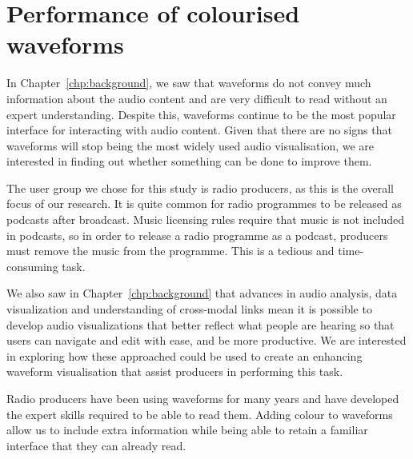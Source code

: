 \chapter{Performance of colourised waveforms}\label{chp:colourised}

In Chapter~\ref{chp:background}, we saw that waveforms do not convey much information about the audio content and are
very difficult to read without an expert understanding.
Despite this, waveforms continue to be the most popular interface for interacting with audio content.
Given that there are no signs that waveforms will stop being the most widely used audio visualisation, we are
interested in finding out whether something can be done to improve them.

The user group we chose for this study is radio producers, as this is the overall focus of our research.
It is quite common for radio programmes to be released as podcasts after broadcast.
Music licensing rules require that music is not included in podcasts, so in order to release a radio programme as a
podcast, producers must remove the music from the programme.
This is a tedious and time-consuming task.

We also saw in Chapter~\ref{chp:background} that advances in audio analysis, data visualization and understanding of
cross-modal links mean it is possible to develop audio visualizations that better reflect what people are hearing so
that users can navigate and edit with ease, and be more productive.
We are interested in exploring how these approached could be used to create an enhancing waveform visualisation that
assist producers in performing this task.

Radio producers have been using waveforms for many years and have developed the expert skills required to be able to
read them.
Adding colour to waveforms allow us to include extra information while being able to retain a familiar interface that
they can already read.



